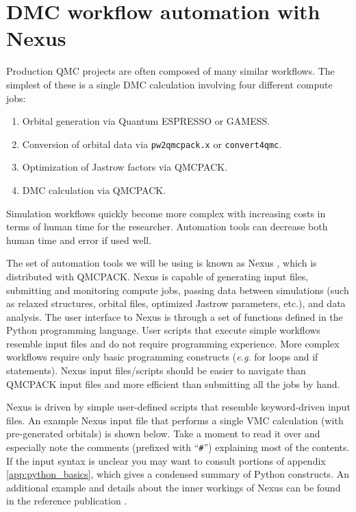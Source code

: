 \section{DMC workflow automation with Nexus}
Production QMC projects are often composed of many similar workflows.  The simplest of these is a single DMC calculation involving four different compute jobs:
\begin{enumerate}
  \item{Orbital generation via Quantum ESPRESSO or GAMESS.}
  \item{Conversion of orbital data via \texttt{pw2qmcpack.x} or \texttt{convert4qmc}.}
  \item{Optimization of Jastrow factors via QMCPACK.}
  \item{DMC calculation via QMCPACK.}
\end{enumerate}
Simulation workflows quickly become more complex with increasing costs in terms of human time for the researcher.  Automation tools can decrease both human time and error if used well.

The set of automation tools we will be using is known as Nexus \cite{Krogel2016nexus}, which is distributed with QMCPACK.  Nexus is capable of generating input files, submitting and monitoring compute jobs, passing data between simulations (such as relaxed structures, orbital files, optimized Jastrow parameters, etc.), and data analysis.  The user interface to Nexus is through a set of functions defined in the Python programming language.  User scripts that execute simple workflows resemble input files and do not require programming experience.  More complex workflows require only basic programming constructs (\emph{e.g.} for loops and if statements).  Nexus input files/scripts should be easier to navigate than QMCPACK input files and more efficient than submitting all the jobs by hand.

Nexus is driven by simple user-defined scripts that resemble keyword-driven input files.  An example Nexus input file that performs a single VMC calculation (with pre-generated orbitals) is shown below.  Take a moment to read it over and especially note the comments (prefixed with ``\texttt{\#}'') explaining most of the contents.  If the input syntax is unclear you may want to consult portions of appendix \ref{app:python_basics}, which gives a condensed summary of Python constructs.  An additional example and details about the inner workings of Nexus can be found in the reference publication \cite{Krogel2016nexus}. 

